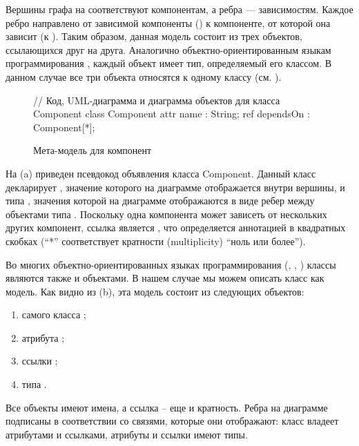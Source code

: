 Вершины графа на  соответствуют компонентам, а ребра --- зависимостям. Каждое ребро направлено от зависимой компоненты () к компоненте, от которой она зависит (к ). Таким образом, данная модель состоит из трех объектов, ссылающихся друг на друга. Аналогично объектно-ориентированным языкам программирования \cite{JLS}, каждый объект имеет тип, определяемый его классом. В данном случае все три объекта относятся к одному классу  (см. ). 

\begin{figure}[htbp]
// Код, UML-диаграмма и диаграмма объектов для класса Component
class Component {
	attr name : String;
	ref dependsOn : Component[*];
}
\caption{Мета-модель для компонент}\label{ComponentClass}
\end{figure}

На  (a) приведен псевдокод объявления класса Component. Данный класс декларирует    , значение которого на диаграмме отображается внутри вершины, и   типа , значения которой на диаграмме отображаются в виде ребер между объектами типа . Поскольку одна компонента может зависеть от нескольких других компонент, ссылка  является , что определяется аннотацией в квадратных скобках (``*'' соответствует кратности (multiplicity) ``ноль или более'').

Во многих объектно-ориентированных языках программирования (, ,  \cite{SmallTalk}) классы являются также и объектами. В нашем случае мы можем описать класс  как модель. Как видно из  (b), эта модель состоит из следующих объектов: 
\begin{enumerate}
\item самого класса ;
\item атрибута ;
\item ссылки ;
\item типа .
\end{enumerate}
Все объекты имеют имена, а ссылка  -- еще и кратность.
Ребра на диаграмме подписаны в соответствии со связями, которые они отображают: класс владеет атрибутами и ссылками, атрибуты и ссылки имеют типы. 

